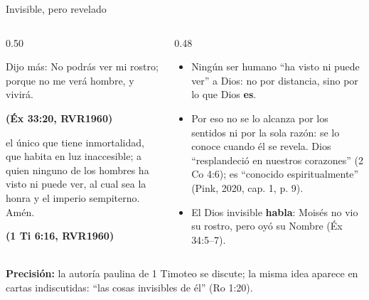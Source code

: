 \documentclass[hyperref={bookmarks=false},aspectratio=169]{beamer}
\newcommand{\fuente}[1]{\par\hfill{\upshape\bfseries\footnotesize\textcolor{azul}{#1}}}
\newcommand{\destacar}[1]{\textbf{\textcolor{azul}{#1}}}
\newcommand{\precision}[1]{{\footnotesize\color{gris}\textbf{Precisión:} #1}}
\begin{document}
\begin{frame}{Invisible, pero revelado}
\begin{columns}[t,onlytextwidth]
\begin{column}{0.50\textwidth}
\begin{cita}Dijo más: No podrás ver mi rostro; porque no me verá hombre, y vivirá.\fuente{(Éx 33:20, RVR1960)}\end{cita}
\begin{cita}el único que tiene inmortalidad, que habita en luz inaccesible; a quien ninguno de los hombres ha visto ni puede ver, al cual sea la honra y el imperio sempiterno. Amén.\fuente{(1 Ti 6:16, RVR1960)}\end{cita}
\end{column}
\begin{column}{0.48\textwidth}\small
\begin{itemize}
\item Ningún ser humano ``ha visto ni puede ver'' a Dios: no por distancia, sino por lo que Dios \destacar{es}.
\item Por eso no se lo alcanza por los sentidos ni por la sola razón: se lo conoce cuando él se revela. Dios ``resplandeció en nuestros corazones'' (2 Co 4:6); es ``conocido espiritualmente'' (Pink, 2020, cap. 1, p. 9).
\item El Dios invisible \destacar{habla}: Moisés no vio su rostro, pero oyó su Nombre (Éx 34:5--7).
\end{itemize}
\end{column}
\end{columns}
\precision{la autoría paulina de 1 Timoteo se discute; la misma idea aparece en cartas indiscutidas: ``las cosas invisibles de él'' (Ro 1:20).}
\end{frame}
\end{document}
